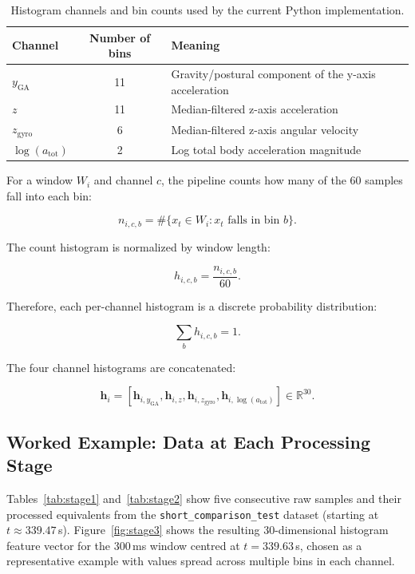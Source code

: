 \documentclass[11pt]{article}
\begin{document}
\begin{table}[h]
\centering
\caption{Histogram channels and bin counts used by the current Python implementation.}
\begin{tabularx}{\textwidth}{lcl}
\toprule
Channel & Number of bins & Meaning \\
\midrule
$y_{\mathrm{GA}}$ & 11 & Gravity/postural component of the y-axis acceleration \\
$z$ & 11 & Median-filtered z-axis acceleration \\
$z_{\mathrm{gyro}}$ & 6 & Median-filtered z-axis angular velocity \\
$\log(a_{\mathrm{tot}})$ & 2 & Log total body acceleration magnitude \\
\bottomrule
\end{tabularx}
\end{table}

For a window $W_i$ and channel $c$, the pipeline counts how many of the 60 samples fall into each bin:

\begin{equation}
    n_{i,c,b} = \#\{x_t \in W_i : x_t \text{ falls in bin } b\}.
\end{equation}

The count histogram is normalized by window length:

\begin{equation}
    h_{i,c,b} = \frac{n_{i,c,b}}{60}.
\end{equation}

Therefore, each per-channel histogram is a discrete probability distribution:

\begin{equation}
    \sum_b h_{i,c,b} = 1.
\end{equation}

The four channel histograms are concatenated:

\begin{equation}
    \mathbf{h}_i =
    \left[
    \mathbf{h}_{i,y_{\mathrm{GA}}},
    \mathbf{h}_{i,z},
    \mathbf{h}_{i,z_{\mathrm{gyro}}},
    \mathbf{h}_{i,\log(a_{\mathrm{tot}})}
    \right]
    \in \mathbb{R}^{30}.
\end{equation}

\subsection{Worked Example: Data at Each Processing Stage}

Tables~\ref{tab:stage1} and~\ref{tab:stage2} show five consecutive raw samples and their
processed equivalents from the \texttt{short\_comparison\_test} dataset (starting at
$t \approx 339.47$\,s). Figure~\ref{fig:stage3} shows the resulting 30-dimensional
histogram feature vector for the 300\,ms window centred at $t = 339.63$\,s,
chosen as a representative example with values spread across multiple bins in each channel.
\end{document}
